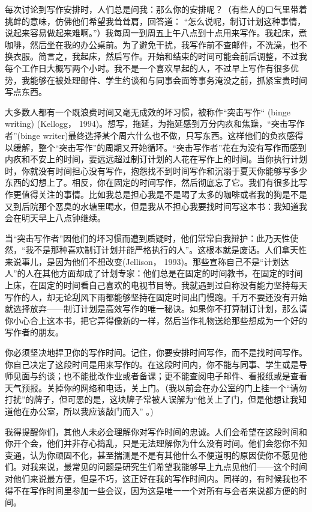 每次讨论到写作安排时，人们总是问我：那么你的安排呢？（有些人的口气里带着挑衅的意味，仿佛他们希望我耸耸肩，回答道： “怎么说呢，制订计划这种事情，说起来容易做起来难啊。”）我每周一到周五上午八点到十点用来写作。我起床，煮咖啡，然后坐在我的办公桌前。为了避免干扰，我写作前不查邮件，不洗澡，也不换衣服。简言之，我起床，然后写作。开始和结束的时间可能会前后调整，不过我每个工作日大概写两个小时。我不是一个喜欢早起的人，不过早上写作有很多优势，我能够在被处理邮件、学生约谈和与同事会面等事务淹没之前，抓紧宝贵时间写点东西。

大多数人都有一个既浪费时间又毫无成效的坏习惯，被称作“突击写作“ (binge writing) (Kellogg， 1994)。想写，拖延，为拖延感到万分内疚和焦躁，“突击写作者”(binge writer)最终选择某个周六什么也不做，只写东西。这样他们的负疚感得以缓解，整个“突击写作”的周期又开始循环。“突击写作者”花在为没有写作而感到内疚和不安上的时间，要远远超过制订计划的人花在写作上的时间。当你执行计划时，你就没有时间担心没有写作，抱怨找不到时间写作和沉溺于夏天你能够写多少东西的幻想上了。相反，你在固定的时间写作，然后彻底忘了它。我们有很多比写作更值得关注的事情。比如我总是担心我是不是喝了太多的咖啡或者我的狗是不是又到后院那个恶臭的水塘里喝水，但是我从不担心我要找时间写这本书：我知道我会在明天早上八点钟继续。

当“突击写作者”因他们的坏习惯而遭到质疑时，他们常常自我辩护：此乃天性使然，“我不是那种喜欢制订计划并能严格执行的人”。这根本就是废话。人们拿天性来说事儿，是因为他们不想改变(Jellison， 1993)。那些宣称自己不是“计划达人”的人在其他方面却成了计划专家：他们总是在固定的时间教书，在固定的时间上床，在固定的时间看自己喜欢的电视节目等。我就遇到过自称没有能力坚持每天写作的人，却无论刮风下雨都能够坚持在固定时间出门慢跑。千万不要还没有开始就选择放弃——制订计划是高效写作的唯一秘诀。如果你不打算制订计划，那么请你小心合上这本书，把它弄得像新的一样，然后当作礼物送给那些想成为一个好的写作者的朋友。

你必须坚决地捍卫你的写作时间。记住，你要安排时间写作，而不是找时间写作。你自己决定了这段时间是用来写作的。在这段时间内，你不能与同事、学生或是导师见面与约谈；也不能批改作业或者备课；更不能查阅电子邮件、看报纸或是查看天气预报。关掉你的网络和电话，关上门。（我以前会在办公室的门上挂一个“请勿打扰”的牌子，但可恶的是，这块牌子常被人误解为“他关上了门，但是他想让我知道他在办公室，所以我应该敲门而入” 。)

我得提醒你们，其他人未必会理解你对写作时间的忠诚。人们会希望在这段时间和你开个会，他们并非存心捣乱，只是无法理解你为什么没有时间。他们会怨你不知变通，认为你顽固不化，甚至揣测是不是有其他什么不便道明的原因使你不愿见他们。对我来说，最常见的问题是研究生们希望我能够早上九点见他们——这个时间对他们来说最方便，但是不巧，这正好在我的写作时间内。同样的，有时候我也不得不在写作时间里参加一些会议，因为这是唯一一个对所有与会者来说都方便的时间。

